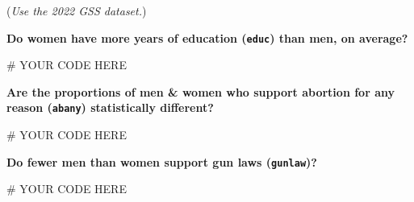 \documentclass[
  letterpaper,
  DIV=11,
  numbers=noendperiod]{scrartcl}
\newenvironment{Shaded}{\begin{snugshade}}{\end{snugshade}}
\newcommand{\CommentTok}[1]{\textcolor[rgb]{0.37,0.37,0.37}{#1}}
\begin{document}
(\emph{Use the 2022 GSS dataset.})

\textbf{Do women have more years of education (\texttt{educ}) than men,
on average?}

\begin{Shaded}
\begin{Highlighting}[]
\CommentTok{\# YOUR CODE HERE}
\end{Highlighting}
\end{Shaded}

\textbf{Are the proportions of men \& women who support abortion for any
reason (\texttt{abany}) statistically different?}

\begin{Shaded}
\begin{Highlighting}[]
\CommentTok{\# YOUR CODE HERE}
\end{Highlighting}
\end{Shaded}

\textbf{Do fewer men than women support gun laws (\texttt{gunlaw})?}

\begin{Shaded}
\begin{Highlighting}[]
\CommentTok{\# YOUR CODE HERE}
\end{Highlighting}
\end{Shaded}
\end{document}

